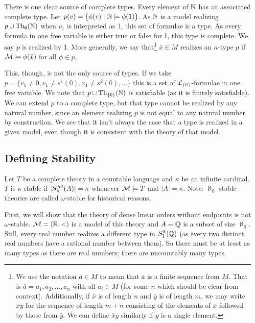 There is one clear source of complete types. 
Every element of \(\mathbb{N}\) has an associated complete type. 
Let \(p(v) = \{\phi(v) \mid \mathbb{N} \models \phi(1)\}\). 
As \(\mathbb{N}\) is a model realizing \(p \cup \text{Th}_\emptyset(\mathbb{N})\) when \(v_1\) is interpreted as 1, this set of formulae is a type. 
As every formula in one free variable is either true or false for 1, this type is complete. 
We say \(p\) is realized by 1. 
More generally, we say that\footnote{We use the notation \(\bar{a} \in M\) to mean that \(\bar{a}\) is a finite sequence from \(M\). That is \(\bar{a} = a_1, a_2, \ldots, a_n\) with all \(a_i \in M\) (for some \(n\) which should be clear from context). Additionally, if \(\bar{x}\) is of length \(n\) and \(\bar{y}\) is of length \(m\), we may write \(\bar{x}\bar{y}\) for the sequence of length \(m+n\) consisting of the elements of \(\bar{x}\) followed by those from \(\bar{y}\). We can define \(\bar{x}y\) similarly if \(y\) is a single element.}
 \(\bar{x} \in M\) realizes an \(n\)-type \(p\) if \(\mathcal{M} \models \phi(\bar{x})\) for all \(\phi \in p\).  

This, though, is not the only source of types. 
If we take \(p = \{v_1 \neq 0, v_1 \neq s^1(0), v_1 \neq s^2(0), \ldots\}\) this is a set of \(\mathcal{L}_{\{0\}}\)-formulae in one free variable. 
We note that \(p \cup \text{Th}_{\{0\}}(\mathbb{N})\) is satisfiable (as it is finitely satisfiable). 
We can extend \(p\) to a complete type, but that type cannot be realized by any natural number, since an element realizing \(p\) is not equal to any natural number by construction. 
We see that it isn't always the case that a type is realized in a given model, even though it is consistent with the theory of that model. 

\subsection{Defining Stability}

\begin{definition}\label{def_stability}
Let \(T\) be a complete theory in a countable language and \(\kappa\) be an infinite cardinal. 
\(T\) is \(\kappa\)-stable if \(|S_n^{\mathcal{M}}(A)| = \kappa\) whenever \(\mathcal{M} \models T\) and \(|A| = \kappa\). 
Note: \(\aleph_0\)-stable theories are called \(\omega\)-stable for historical reasons. 
\end{definition}

First, we will show that the theory of dense linear orders without endpoints is not \(\omega\)-stable. 
\(\mathcal{M} = (\mathbb{R}, <)\) is a model of this theory and \(A = \mathbb{Q}\) is a subset of size \(\aleph_0\). 
Still, every real number realizes a different type in \(S_1^{\mathbb{R}}(\mathbb{Q})\) (as every two distinct real numbers have a rational number between them). 
So there must be at least as many types as there are real numbers; there are uncountably many types.  

